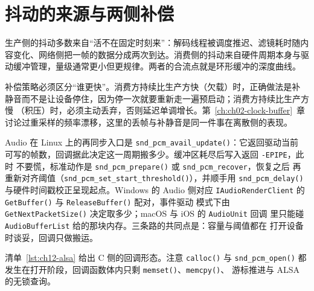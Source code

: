 \documentclass[12pt,a4paper,fontset=fandol]{ctexbook}
\newcommand{\Fn}[1]{\texttt{#1()}}
\newcommand{\Tp}[1]{\texttt{#1}}
\newcommand{\Lang}[1]{\textsf{#1}}
\newcommand{\CL}{\Lang{C}}
\newcommand{\DomAud}{\Lang{Audio}}
\begin{document}
\section{抖动的来源与两侧补偿}

生产侧的抖动多数来自``活不在固定时刻来''：解码线程被调度推迟、滤镜耗时随内容变化、网络侧把一帧的数据分成两次到达。消费侧的抖动来自硬件周期本身与驱动缓冲管理，量级通常更小但更规律。两者的合流点就是环形缓冲的深度曲线。

补偿策略必须区分``谁更快''。消费方持续比生产方快（欠载）时，正确做法是补
静音而不是让设备停住，因为停一次就要重新走一遍预启动；消费方持续比生产方慢
（积压）时，必须主动丢弃，否则延迟单调增长。第~\ref{ch:ch02-clock-buffer}~章
讨论过重采样的频率漂移，这里的丢帧与补静音是同一件事在离散侧的表现。

\DomAud{} 在 Linux 上的再同步入口是 \Fn{snd\_pcm\_avail\_update}：它返回驱动当前
可写的帧数，回调据此决定这一周期搬多少。缓冲区耗尽后写入返回 \Tp{-EPIPE}，此时
不要慌，标准动作是 \Fn{snd\_pcm\_prepare} 或 \Tp{snd\_pcm\_recover}，恢复之后
再重新对齐阈值（\Fn{snd\_pcm\_set\_start\_threshold}），并顺手用
\Fn{snd\_pcm\_delay} 与硬件时间戳校正呈现起点。Windows 的 \DomAud{} 侧对应
\Tp{IAudioRenderClient} 的 \Fn{GetBuffer} 与 \Fn{ReleaseBuffer} 配对，事件驱动
模式下由 \Fn{GetNextPacketSize} 决定取多少；macOS 与 iOS 的 \Tp{AudioUnit} 回调
里只能碰 \Tp{AudioBufferList} 给的那块内存。三条路的共同点是：容量与阈值都在
打开设备时谈妥，回调只做搬运。

清单~\ref{lst:ch12-alsa} 给出 \CL{} 侧的回调形态。注意 \Fn{calloc} 与
\Fn{snd\_pcm\_open} 都发生在打开阶段，回调函数体内只剩 \Fn{memset}、\Fn{memcpy}、
游标推进与 ALSA 的无锁查询。
\end{document}
